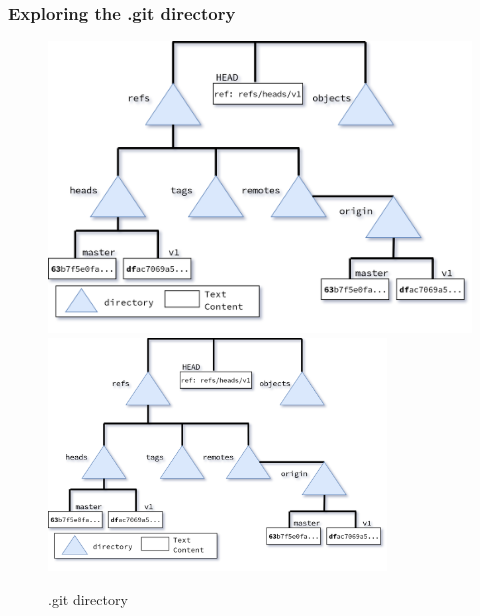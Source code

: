 \begin{frame}
    \frametitle{Exploring the .git directory}
    \addtocounter{page}{-1}
    \begin{figure}
        \begin{center}
            {
                \includegraphics[height=0.75\textheight,keepaspectratio]{./images/gitDirectory-Total.png}
            }
            {
                \includegraphics[height=0.75\textheight,width=0.8\textwidth]{./images/gitDirectory-Total.png}
            }
            \caption{.git directory}
        \end{center}
    \end{figure}
\end{frame}

